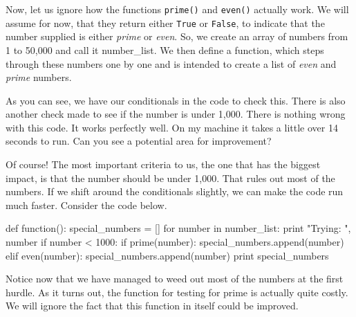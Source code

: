 Now, let us ignore how the functions \texttt{prime()} and \texttt{even()} actually work.
We will assume for now, that they return either \texttt{True} or \texttt{False}, to indicate that the number supplied is either \textit{prime} or \textit{even}.
So, we create an array of numbers from 1 to 50,000 and call it number\_list.
We then define a function, which steps through these numbers one by one and is intended to create a list of \textit{even} and \textit{prime} numbers.

As you can see, we have our conditionals in the code to check this. There is also another check made to see if the number is under 1,000.
There is nothing wrong with this code. It works perfectly well. On my machine it takes a little over 14 seconds to run.
Can you see a potential area for improvement?

Of course! The most important criteria to us, the one that has the biggest impact, is that the number should be under 1,000. 
That rules out most of the numbers. 
If we shift around the conditionals slightly, we can make the code run much faster. Consider the code below.

\begin{code}
def function():
	special_numbers = []
	for number in number_list:
		print "Trying: ", number
		if number < 1000:
			if prime(number):
				special_numbers.append(number)
			elif even(number):
				special_numbers.append(number)
	print special_numbers
\end{code}

Notice now that we have managed to weed out most of the numbers at the first hurdle.
As it turns out, the function for testing for prime is actually quite costly.
We will ignore the fact that this function in itself could be improved.

